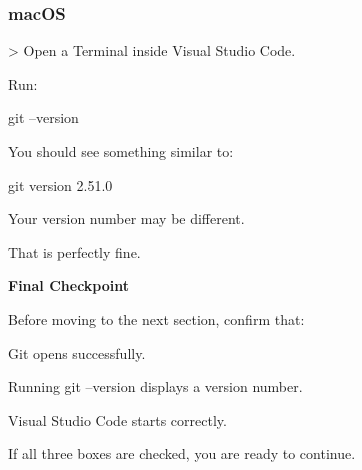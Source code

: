\documentclass{csc2059practical}
\begin{document}
\subsubsection{macOS}
> Open a Terminal inside Visual Studio Code.

Run:

\begin{terminalplain}
git --version
\end{terminalplain}
You should see something similar to:

\begin{terminalplain}
git version 2.51.0
\end{terminalplain}
Your version number may be different.

That is perfectly fine.

\begin{reflectionbox}
\textbf{Final Checkpoint}\par
\medskip

Before moving to the next section, confirm that:


Git opens successfully.


Running git --version displays a version number.


Visual Studio Code starts correctly.


If all three boxes are checked, you are ready to continue.


\end{reflectionbox}
\end{document}
